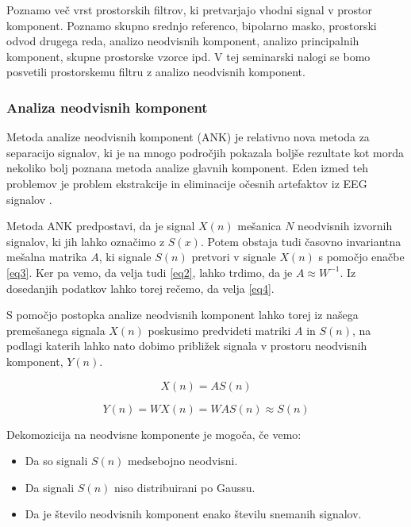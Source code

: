 \documentclass[9pt]{IEEEtran}
\begin{document}
Poznamo več vrst prostorskih filtrov, ki pretvarjajo vhodni signal v prostor komponent. Poznamo skupno srednjo referenco, bipolarno masko, prostorski odvod drugega reda, analizo neodvisnih komponent, analizo principalnih komponent, skupne prostorske vzorce ipd. V tej seminarski nalogi se bomo posvetili prostorskemu filtru z analizo neodvisnih komponent.

\subsubsection{Analiza neodvisnih komponent}

Metoda analize neodvisnih komponent (ANK) je relativno nova metoda za separacijo signalov, ki je na mnogo področjih pokazala boljše rezultate kot morda nekoliko bolj poznana metoda analize glavnih komponent. Eden izmed teh problemov je problem ekstrakcije in eliminacije očesnih artefaktov iz EEG signalov \cite{ochoa2002eeg}.

Metoda ANK  predpostavi, da je signal $X(n)$ mešanica $N$ neodvisnih izvornih signalov, ki jih lahko označimo z $S(x)$. Potem obstaja tudi časovno invariantna mešalna matrika $A$, ki signale $S(n)$ pretvori v signale $X(n)$ s pomočjo enačbe \ref{eq3}. Ker pa vemo, da velja tudi \ref{eq2}, lahko trdimo, da je $A \approx W^{-1}$. Iz dosedanjih podatkov lahko torej rečemo, da velja \ref{eq4}. 

S pomočjo postopka analize neodvisnih komponent lahko torej iz našega premešanega signala  $X(n)$  poskusimo predvideti matriki $A$ in $S(n)$, na podlagi katerih lahko nato dobimo približek signala v prostoru neodvisnih komponent, $Y(n)$.


\begin{equation} \label{eq3}
X(n) = AS(n)
\end{equation}

\begin{equation} \label{eq4}
Y(n) = WX(n) = WAS(n) \approx S(n)
\end{equation}

Dekomozicija na neodvisne komponente je mogoča, če vemo:

\begin{itemize}
  \item Da so signali $S(n)$ medsebojno neodvisni.
  \item Da signali $S(n)$ niso distribuirani po Gaussu.
  \item Da je število neodvisnih komponent enako številu snemanih signalov.
\end{itemize}
\end{document}

